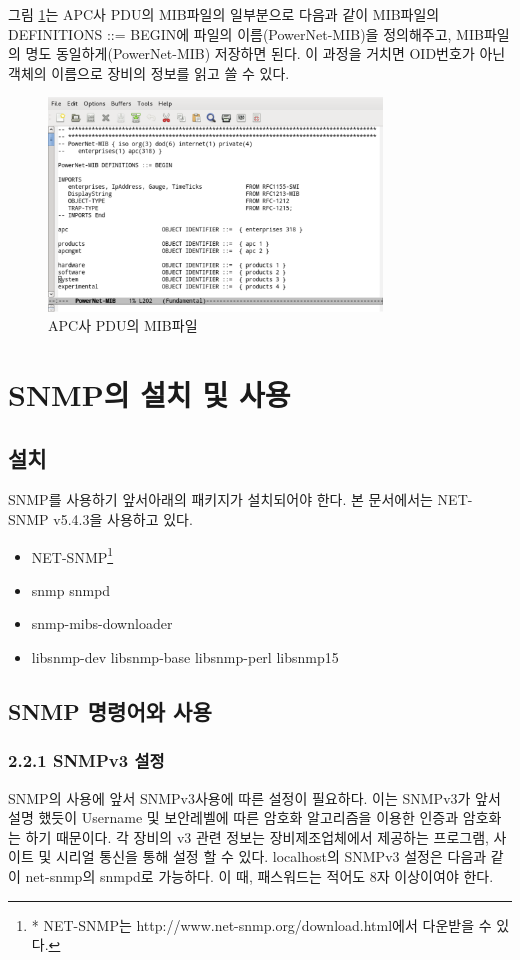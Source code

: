 \documentclass[11pt
  , a4paper
  , article
  , oneside
]{memoir}
\begin{document}
그림 \ref{fig:pdu_mib}는 APC사 PDU의 MIB파일의 일부분으로 다음과 같이 MIB파일의 DEFINITIONS ::= BEGIN에 파일의 이름(PowerNet-MIB)을 정의해주고, MIB파일의 명도 동일하게(PowerNet-MIB) 저장하면 된다. 이 과정을 거치면 OID번호가 아닌 객체의 이름으로 장비의 정보를 읽고 쓸 수 있다. 


\begin{figure}[h]
  \centering
  \includegraphics[width=0.79\textwidth]{./images/pdu_mib.eps}
  \caption{APC사 PDU의 MIB파일}
  \label{fig:pdu_mib}   
\end{figure}


\clearpage

\chapter{SNMP의 설치 및 사용}
\section{설치}
SNMP를 사용하기 앞서아래의 패키지가 설치되어야 한다. 본 문서에서는 NET-SNMP\citep{net_snmp} v5.4.3을 사용하고 있다.
\begin{itemize}
\item NET-SNMP\footnote{* NET-SNMP는 http://www.net-snmp.org/download.html에서 다운받을 수 있다.}
\item snmp snmpd
\item snmp-mibs-downloader
\item libsnmp-dev libsnmp-base libsnmp-perl libsnmp15 
\end{itemize}


\section{SNMP 명령어와 사용}

\subsection{2.2.1 SNMPv3 설정}
SNMP의 사용에 앞서 SNMPv3사용에 따른 설정이 필요하다. 이는 SNMPv3가 앞서 설명 했듯이 Username 및 보안레벨에 따른 암호화 알고리즘을 이용한 인증과 암호화는 하기 때문이다. 각 장비의 v3 관련 정보는 장비제조업체에서 제공하는 프로그램, 사이트 및 시리얼 통신을 통해 설정 할 수 있다. localhost의 SNMPv3 설정은 다음과 같이 net-snmp의 snmpd로 가능하다. 이 때, 패스워드는 적어도 8자 이상이여야 한다.
\end{document}
